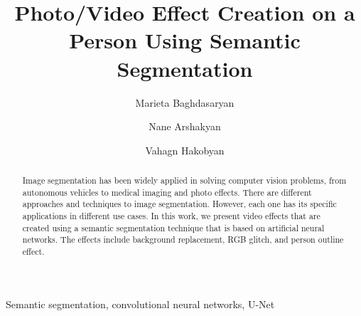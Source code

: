 \documentclass[english]{sbrt}
\begin{document}
\title{Photo/Video Effect Creation on a Person Using Semantic Segmentation}

\author[1*]{Marieta Baghdasaryan}
\author[2*]{Nane Arshakyan}
\author[3**]{Vahagn Hakobyan}

\maketitle



\begin{abstract}
Image segmentation has been widely applied in solving computer vision problems, from autonomous vehicles to medical imaging and photo effects. There are different approaches and techniques to image segmentation. However, each one has its specific applications in different use cases. In this work, we present video effects that are created using a semantic segmentation technique that is based on artificial neural networks. The effects include background replacement, RGB glitch, and person outline effect.
\end{abstract}
\begin{keywords}
Semantic segmentation, convolutional neural networks, U-Net
\end{keywords}
\end{document}
